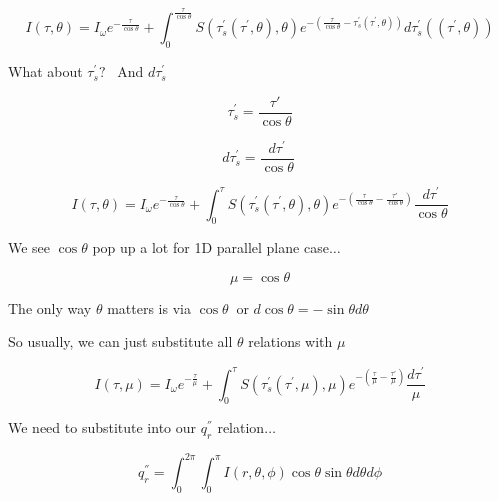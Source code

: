 \documentclass[12pt]{article}
\renewcommand{\_}{\kern-1.5pt\textunderscore\kern-1.5pt}
\begin{document}
 \[ I \left(  \tau, \theta  \right) =I_{ \omega }e^{-\frac{ \tau}{\cos  \theta }}+ \int _{0}^{\frac{ \tau}{\cos  \theta }}S \left(  \tau_{s}^{'} \left(  \tau^{'}, \theta  \right) , \theta  \right) e^{- \left( \frac{ \tau}{\cos  \theta }- \tau_{s}^{'} \left(  \tau^{'}, \theta  \right)  \right) }d \tau_{s}^{'} \left(  \left(  \tau^{'}, \theta  \right)  \right)  \] \par

What about  \(  \tau_{s}^{'}? \) \ And   \( d \tau_{s}^{'} \) \par

 \[  \tau_{s}^{'}=\frac{ \tau'}{\cos  \theta } \] \par

 \[ d \tau_{s}^{'}=\frac{d \tau^{'}}{\cos  \theta }~ \] \par

 \[ I \left(  \tau, \theta  \right) =I_{ \omega }e^{-\frac{ \tau}{\cos  \theta }}+ \int _{0}^{ \tau}S \left(  \tau_{s}^{'} \left(  \tau^{'}, \theta  \right) , \theta  \right) e^{- \left( \frac{ \tau}{\cos  \theta }-\frac{ \tau'}{\cos  \theta } \right) }\frac{d \tau^{'}}{\cos  \theta } \] \par

We see  \( \cos  \theta  \)  pop up a lot for 1D parallel plane case$ \ldots $ \par

 \[  \mu =\cos  \theta  \] \par

The only way  \(  \theta  \)  matters is via  \( \cos  \theta ~ \) or  \( d\cos  \theta =-\sin  \theta  d \theta  \) \par

So usually, we can just substitute all  \(  \theta  \)  relations with  \(  \mu  \) \par

 \[ I \left(  \tau, \mu  \right) =I_{ \omega }e^{-\frac{ \tau}{ \mu }}+ \int _{0}^{ \tau}S \left(  \tau_{s}^{'} \left(  \tau^{'}, \mu  \right) , \mu  \right) e^{- \left( \frac{ \tau}{ \mu }-\frac{ \tau'}{ \mu } \right) }\frac{d \tau^{'}}{ \mu } \] \par

We need to substitute into our  \( q_{r}^{''} \)  relation$ \ldots $ \par

 \[ q_{r}^{''}= \int _{0}^{2 \pi } \int _{0}^{ \pi }I \left( r,  \theta , \phi  \right) \cos  \theta \sin  \theta  d \theta  d \phi  \] \par
\end{document}
